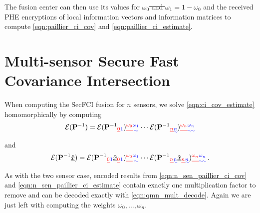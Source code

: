 \documentclass[letterpaper, 10 pt, conference]{ieeeconf}  %
\providecommand{\DIFadd}[1]{{\protect\color{blue}\uwave{#1}}} %
\providecommand{\DIFdel}[1]{{\protect\color{red}\sout{#1}}}                      %
\providecommand{\DIFaddbegin}{} %
\providecommand{\DIFaddend}{} %
\providecommand{\DIFdelbegin}{} %
\providecommand{\DIFdelend}{} %
\begin{document}
The fusion center can then use its values for \DIFdelbegin \DIFdel{$\omega_0$ and $\omega_1 = 1-\omega_0$ }\DIFdelend \DIFaddbegin \DIFadd{$\omega_1$ and $\omega_2 = 1-\omega_1$ }\DIFaddend and the received PHE encryptions of local information vectors and information matrices to compute \eqref{eqn:paillier_ci_cov} and \eqref{eqn:paillier_ci_estimate}.




\section{Multi-sensor Secure Fast Covariance Intersection} \label{sec:multi_secfci}
When computing the SecFCI fusion for $n$ sensors, we solve \eqref{eqn:ci_cov_estimate} homomorphically by computing
\begin{equation}
   \mathcal{E}(\mP^{-1}) = \mathcal{E}(\mP^{-1}\DIFdelbegin \DIFdel{_0}\DIFdelend \DIFaddbegin \DIFadd{_1}\DIFaddend )\DIFdelbegin \DIFdel{^{\omega_0}}\DIFdelend \DIFaddbegin \DIFadd{^{\omega_1}}\DIFaddend \cdots\mathcal{E}(\mP^{-1}\DIFdelbegin \DIFdel{_n}\DIFdelend \DIFaddbegin \DIFadd{_{n}}\DIFaddend )\DIFdelbegin \DIFdel{^{\omega_n} }\DIFdelend \DIFaddbegin \DIFadd{^{\omega_{n}} }\DIFaddend \label{eqn:n_sen_paillier_ci_cov}
\end{equation}
and
\begin{equation}
   \mathcal{E}(\mP^{-1}\mean{\vec{x}}) = \mathcal{E}(\mP^{-1}\DIFdelbegin \DIFdel{_0}\DIFdelend \DIFaddbegin \DIFadd{_1}\DIFaddend \mean{\vec{x}}\DIFdelbegin \DIFdel{_0}\DIFdelend \DIFaddbegin \DIFadd{_1}\DIFaddend )\DIFdelbegin \DIFdel{^{\omega_0}}\DIFdelend \DIFaddbegin \DIFadd{^{\omega_1}}\DIFaddend \cdots\mathcal{E}(\mP^{-1}\DIFdelbegin \DIFdel{_n}\DIFdelend \DIFaddbegin \DIFadd{_{n}}\DIFaddend \mean{\vec{x}}\DIFdelbegin \DIFdel{_n}\DIFdelend \DIFaddbegin \DIFadd{_{n}}\DIFaddend )\DIFdelbegin \DIFdel{^{\omega_n}}\DIFdelend \DIFaddbegin \DIFadd{^{\omega_{n}}}\DIFaddend \,. \label{eqn:n_sen_paillier_ci_estimate}
\end{equation}
As with the two sensor case, encoded results from \eqref{eqn:n_sen_paillier_ci_cov} and \eqref{eqn:n_sen_paillier_ci_estimate} contain exactly one multiplication factor to remove and can be decoded exactly with \eqref{eqn:qmn_mult_decode}. Again we are just left with computing the weights \DIFdelbegin \DIFdel{$\omega_0,\dots,\omega_n$}\DIFdelend \DIFaddbegin \DIFadd{$\omega_1,\dots,\omega_{n}$}\DIFaddend .
\end{document}
